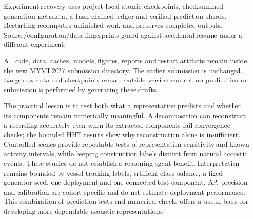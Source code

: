 \documentclass[11pt,letterpaper]{article}
\begin{document}
Experiment recovery uses project-local atomic checkpoints, checksummed generation metadata, a hash-chained ledger and verified prediction shards. Restarting recomputes unfinished work and preserves completed outputs. Source/configuration/data fingerprints guard against accidental resume under a different experiment.\par

All code, data, caches, models, figures, reports and restart artifacts remain inside the new MVML2027 submission directory. The earlier submission is unchanged. Large raw data and checkpoints remain outside version control; no publication or submission is performed by generating these drafts.\par

The practical lesson is to test both what a representation predicts and whether its components remain numerically meaningful. A decomposition can reconstruct a recording accurately even when its extracted components fail convergence checks; the bounded HHT results show why reconstruction alone is insufficient. Controlled scenes provide repeatable tests of representation sensitivity and known activity intervals, while keeping construction labels distinct from natural acoustic events. These studies do not establish a reasoning-agent benefit. Interpretation remains bounded by vessel-tracking labels, artificial class balance, a fixed generator seed, one deployment and one connected test component. AP, precision and calibration are cohort-specific and do not estimate deployment performance. This combination of prediction tests and numerical checks offers a useful basis for developing more dependable acoustic representations.\par

{\fontsize{9}{11}\selectfont





}
\end{document}
